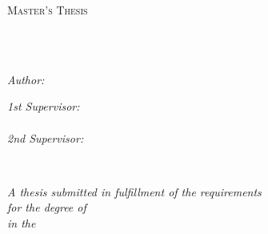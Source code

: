 \documentclass[
11pt, %
oneside, %
english, %
singlespacing, %
headsepline, %
]{thesis} %
\author{Atreya \textsc{Shankar} (799227)} %
\theoremstyle{definition}
\theoremstyle{remark}
\begin{document}
\pagestyle{plain} %


\begin{titlepage}
\begin{center}

\vspace*{.06\textheight}
{\scshape\LARGE \univname\par}\vspace{1.5cm} %
\textsc{\Large Master's Thesis}\\[0.5cm] %

\HRule \\[0.4cm] %
{\huge \bfseries \ttitle\par}\vspace{0.4cm} %
\HRule \\[1.5cm] %
 
\begin{minipage}[t]{0.4\textwidth}
\begin{flushleft} \large
\emph{Author:}\\
\href{https://www.linkedin.com/in/atreya-shankar-644352113}{\authorname} %
\end{flushleft}
\end{minipage}
\begin{minipage}[t]{0.4\textwidth}
\begin{flushright} \large
\emph{1st Supervisor:} \\
\href{https://sites.google.com/site/loaicigasharid/portada}{\supname} \\[10pt] %
\emph{2nd Supervisor:} \\
\href{https://www.uzh.ch/cmsssl/cl/de/people/team/compling/mmueller.html}{\examname} %
\end{flushright}
\end{minipage}\\[3cm]
 
\vfill

\large \textit{A thesis submitted in fulfillment of the requirements\\ for the degree of \degreename}\\[0.3cm] %
\textit{in the}\\[0.4cm]
\groupname\\\deptname\\[2cm] %
 

\end{center}
\end{titlepage}
\end{document}
